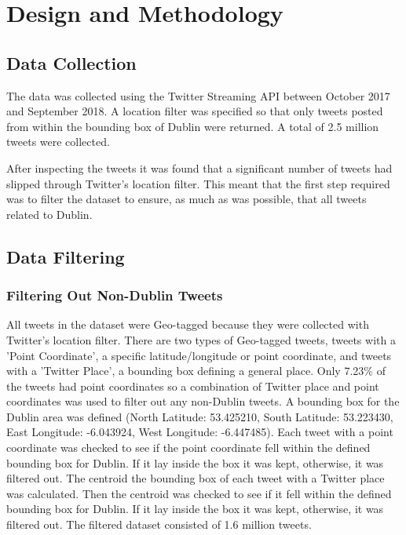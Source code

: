 \section{Design and Methodology}

\subsection{Data Collection}
The data was collected using the Twitter Streaming API between October 2017 and September 2018. A location filter was specified so that only tweets posted from within the bounding box of Dublin were returned. A total of 2.5 million tweets were collected.

After inspecting the tweets it was found that a significant number of tweets had slipped through Twitter's location filter. This meant that the first step required was to filter the dataset to ensure, as much as was possible, that all tweets related to Dublin.

\subsection{Data Filtering}

\subsubsection{Filtering Out Non-Dublin Tweets}
All tweets in the dataset were Geo-tagged because they were collected with Twitter's location filter. There are two types of Geo-tagged tweets, tweets with a 'Point Coordinate', a specific latitude/longitude or point coordinate, and tweets with a 'Twitter Place', a bounding box defining a general place. Only 7.23\% of the tweets had point coordinates so a combination of Twitter place and point coordinates was used to filter out any non-Dublin tweets. A bounding box for the Dublin area was defined (North Latitude: 53.425210, South Latitude: 53.223430, East Longitude: -6.043924, West Longitude: -6.447485). Each tweet with a point coordinate was checked to see if the point coordinate fell within the defined bounding box for Dublin. If it lay inside the box it was kept, otherwise, it was filtered out. The centroid the bounding box of each tweet with a Twitter place was calculated. Then the centroid was checked to see if it fell within the defined bounding box for Dublin. If it lay inside the box it was kept, otherwise, it was filtered out. The filtered dataset consisted of 1.6 million tweets.

